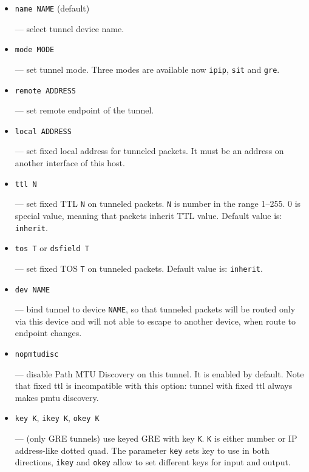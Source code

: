 \begin{itemize}

\item \verb|name NAME| (default)

--- select tunnel device name.

\item \verb|mode MODE|

--- set tunnel mode. Three modes are available now
	\verb|ipip|, \verb|sit| and \verb|gre|.

\item \verb|remote ADDRESS|

--- set remote endpoint of the tunnel.

\item \verb|local ADDRESS|

--- set fixed local address for tunneled packets.
It must be an address on another interface of this host.

\item \verb|ttl N|

--- set fixed TTL \verb|N| on tunneled packets.
	\verb|N| is number in the range 1--255. 0 is special value,
	meaning that packets inherit TTL value. 
		Default value is: \verb|inherit|.

\item \verb|tos T| or \verb|dsfield T|

--- set fixed TOS \verb|T| on tunneled packets.
		Default value is: \verb|inherit|.



\item \verb|dev NAME| 

--- bind tunnel to device \verb|NAME|, so that
	tunneled packets will be routed only via this device and will
	not able to escape to another device, when route to endpoint changes.

\item \verb|nopmtudisc|

--- disable Path MTU Discovery on this tunnel.
	It is enabled by default. Note that fixed ttl is incompatible
	with this option: tunnel with fixed ttl always makes pmtu discovery.

\item \verb|key K|, \verb|ikey K|, \verb|okey K|

--- (only GRE tunnels) use keyed GRE with key \verb|K|. \verb|K| is
	either number or IP address-like dotted quad.
   The parameter \verb|key| sets key to use in both directions,
   \verb|ikey| and \verb|okey| allow to set different keys for input and output.
   


\end{itemize}

